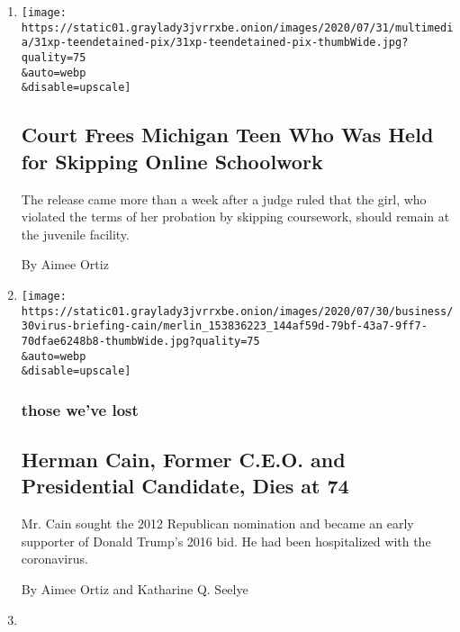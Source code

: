 \begin{enumerate}
\def\labelenumi{\arabic{enumi}.}
\item
  \href{/2020/07/31/us/michigan-teen-homework-release.html}{}

  \texttt{[image: https://static01.graylady3jvrrxbe.onion/images/2020/07/31/multimedia/31xp-teendetained-pix/31xp-teendetained-pix-thumbWide.jpg?quality=75\\\&auto=webp\\\&disable=upscale]}

  \hypertarget{court-frees-michigan-teen-who-was-held-for-skipping-online-schoolwork}{%
  \subsection{Court Frees Michigan Teen Who Was Held for Skipping Online
  Schoolwork}\label{court-frees-michigan-teen-who-was-held-for-skipping-online-schoolwork}}

  The release came more than a week after a judge ruled that the girl,
  who violated the terms of her probation by skipping coursework, should
  remain at the juvenile facility.

  By Aimee Ortiz
\item
  \href{/2020/07/30/us/politics/herman-cain-dead.html}{}

  \texttt{[image: https://static01.graylady3jvrrxbe.onion/images/2020/07/30/business/30virus-briefing-cain/merlin\_153836223\_144af59d-79bf-43a7-9ff7-70dfae6248b8-thumbWide.jpg?quality=75\\\&auto=webp\\\&disable=upscale]}

  \hypertarget{those-weve-lost}{%
  \subsubsection{those we've lost}\label{those-weve-lost}}

  \hypertarget{herman-cain-former-ceo-and-presidential-candidate-dies-at-74}{%
  \subsection{Herman Cain, Former C.E.O. and Presidential Candidate,
  Dies at
  74}\label{herman-cain-former-ceo-and-presidential-candidate-dies-at-74}}

  Mr. Cain sought the 2012 Republican nomination and became an early
  supporter of Donald Trump's 2016 bid. He had been hospitalized with
  the coronavirus.

  By Aimee Ortiz and Katharine Q. Seelye
\item
  \href{/2020/07/28/arts/alan-menken-egot.html}{}


\end{enumerate}
